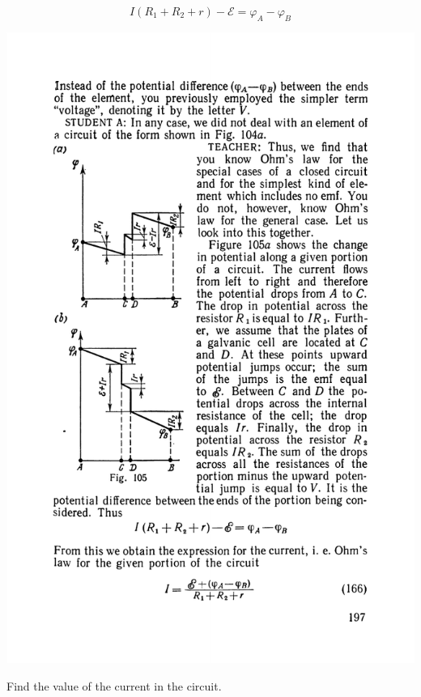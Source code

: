 \documentclass[a4paper,sfsidenotes]{tufte-book}
\newcommand{\Ea}{\mathcal{E}}
\begin{document}
\begin{equation*}%
I(R_{1}+R_{2}+r) - \Ea=  \varphi_{A} - \varphi_{B} 
\end{equation*}
\begin{marginfigure}%
\centering
\includegraphics[width=\linewidth]{fig-105a}
\caption{Find the value of the current in the circuit.}
\label{fig-105}
\end{marginfigure}
\end{document}
